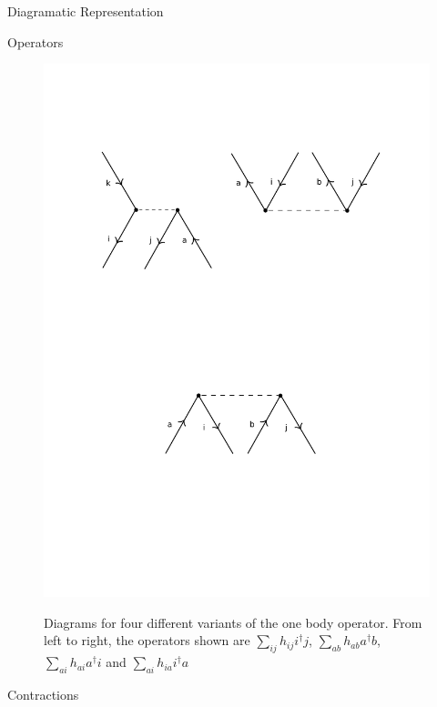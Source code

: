 \documentclass[twoside,english]{uiofysmaster}
\begin{document}
\begin{chapter}{Diagramatic Representation}
\begin{section}{Operators}
		\begin{figure}[H]
			\includegraphics[width=\textwidth]{Figures/TwoBodyOperator2.pdf}
			\label{TwoBodyOperator2}
			\caption{Diagrams for four different variants of the one body operator. From left to right, the operators shown are $\sum_{ij} h_{ij} i^\dagger j $, $\sum_{ab} h_{ab} a^\dagger b$, $\sum_{ai}h_{ai} a^\dagger i$ and $\sum_{ai} h_{ia} i^\dagger a$}
		\end{figure}

	\end{section}

	\begin{section}{Contractions}
		
	\end{section}
	


\end{chapter}
\end{document}
